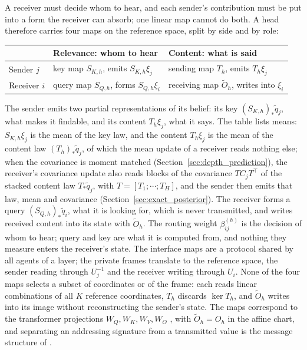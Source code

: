 \documentclass[twoside,11pt]{article}
\begin{document}
A receiver must decide whom to hear, and each sender's contribution must be put into a form the receiver can absorb; one linear map cannot do both. A head therefore carries four maps on the reference space, split by side and by role:
\begin{center}
\small
\begin{tabular}{@{}lll@{}}
\toprule
 & Relevance: whom to hear & Content: what is said \\
\midrule
Sender \(j\) & key map \(S_{K,h}\), emits \(S_{K,h}\xi_j\) & sending map \(T_h\), emits \(T_h\xi_j\) \\
Receiver \(i\) & query map \(S_{Q,h}\), forms \(S_{Q,h}\xi_i\) & receiving map \(\widetilde O_h\), writes into \(\xi_i\) \\
\bottomrule
\end{tabular}
\end{center}
The sender emits two partial representations of its belief: its key \((S_{K,h})_*\widetilde q_j\), what makes it findable, and its content \(T_h\xi_j\), what it says. The table lists means: \(S_{K,h}\xi_j\) is the mean of the key law, and the content \(T_h\xi_j\) is the mean of the content law \((T_h)_*\widetilde q_j\), of which the mean update of a receiver reads nothing else; when the covariance is moment matched (Section~\ref{sec:depth_prediction}), the receiver's covariance update also reads blocks of the covariance \(TC_jT^\top\) of the stacked content law \(T_*\widetilde q_j\), with \(T=[T_1;\cdots;T_H]\), and the sender then emits that law, mean and covariance (Section~\ref{sec:exact_posterior}). The receiver forms a query \((S_{Q,h})_*\widetilde q_i\), what it is looking for, which is never transmitted, and writes received content into its state with \(\widetilde O_h\). The routing weight \(\beta_{ij}^{(h)}\) is the decision of whom to hear; query and key are what it is computed from, and nothing they measure enters the receiver's state. The interface maps are a protocol shared by all agents of a layer; the private frames translate to the reference space, the sender reading through \(U_j^{-1}\) and the receiver writing through \(U_i\). None of the four maps selects a subset of coordinates or of the frame: each reads linear combinations of all \(K\) reference coordinates, \(T_h\) discards \(\ker T_h\), and \(\widetilde O_h\) writes into its image without reconstructing the sender's state. The maps correspond to the transformer projections \(W_Q,W_K,W_V,W_O\) \citep{vaswani2017attention}, with \(\widetilde O_h=O_h\) in the affine chart, and separating an addressing signature from a transmitted value is the message structure of \citet{Das2019TarMAC}.
\end{document}
